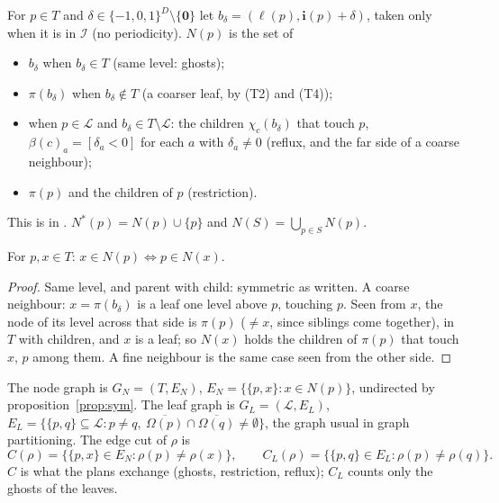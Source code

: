 \begin{definition}[neighbourhood]
  \label{def:nbhd}
  For $p \in T$ and $\delta \in \{-1, 0, 1\}^D \setminus \{\mathbf{0}\}$
  let $b_\delta = (\ell(p), \mathbf{i}(p) + \delta)$, taken only when it is
  in $\mathcal{I}$ (no periodicity). $N(p)$ is the set of
  \begin{itemize}
    \item $b_\delta$ when $b_\delta \in T$ (same level: ghosts);
    \item $\pi(b_\delta)$ when $b_\delta \notin T$ (a coarser leaf, by
      (T2) and (T4));
    \item when $p \in \mathcal{L}$ and $b_\delta \in T \setminus
      \mathcal{L}$: the children $\chi_c(b_\delta)$ that touch $p$,
      $\beta(c)_a = [\delta_a < 0]$ for each $a$ with $\delta_a \ne 0$
      (reflux, and the far side of a coarse neighbour);
    \item $\pi(p)$ and the children of $p$ (restriction).
  \end{itemize}
  This is  in . $N^*(p) = N(p) \cup \{p\}$
  and $N(S) = \bigcup_{p \in S} N(p)$.
\end{definition}

\begin{proposition}[symmetry]
  \label{prop:sym}
  For $p, x \in T$: $x \in N(p) \iff p \in N(x)$.
\end{proposition}

\begin{proof}
  Same level, and parent with child: symmetric as written. A coarse
  neighbour: $x = \pi(b_\delta)$ is a leaf one level above $p$, touching
  $p$. Seen from $x$, the node of its level across that side is $\pi(p)$
  ($\ne x$, since siblings come together), in $T$ with children, and $x$
  is a leaf; so $N(x)$ holds the children of $\pi(p)$ that touch $x$, $p$
  among them. A fine neighbour is the same case seen from the other side.
\end{proof}

\begin{definition}
  The node graph is $G_N = (T, E_N)$, $E_N = \{\{p, x\} : x \in N(p)\}$,
  undirected by proposition~\ref{prop:sym}. The leaf graph is $G_L =
  (\mathcal{L}, E_L)$, $E_L = \{\{p, q\} \subseteq \mathcal{L} : p \ne q,\
  \overline{\Omega(p)} \cap \overline{\Omega(q)} \ne \emptyset\}$, the graph
  usual in graph partitioning. The edge cut of $\rho$ is
  \[
    C(\rho) = \{\{p, x\} \in E_N : \rho(p) \ne \rho(x)\}, \qquad
    C_L(\rho) = \{\{p, q\} \in E_L : \rho(p) \ne \rho(q)\}.
  \]
  $C$ is what the plans exchange (ghosts, restriction, reflux); $C_L$
  counts only the ghosts of the leaves.
\end{definition}

